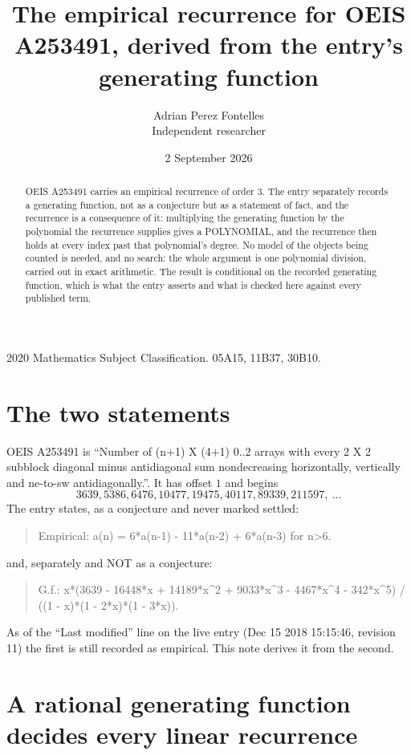 \documentclass[11pt,a4paper]{article}
\title{The empirical recurrence for OEIS A253491, derived from the entry's generating function}
\author{Adrian Perez Fontelles\\ \small Independent researcher}
\date{2 September 2026}
\theoremstyle{plain}
\theoremstyle{definition}
\begin{document}
\maketitle

\begin{abstract}
OEIS A253491 carries an empirical recurrence of order $3$. The entry separately records a
generating function, not as a conjecture but as a statement of fact, and the recurrence is a
consequence of it: multiplying the generating function by the polynomial the recurrence
supplies gives a POLYNOMIAL, and the recurrence then holds at every index past that
polynomial's degree. No model of the objects being counted is needed, and no search: the
whole argument is one polynomial division, carried out in exact arithmetic. The result is
conditional on the recorded generating function, which is what the entry asserts and what is
checked here against every published term.
\end{abstract}

\noindent\small 2020 Mathematics Subject Classification. 05A15, 11B37, 30B10.\normalsize

\section{The two statements}

OEIS A253491 is ``Number of (n+1) X (4+1) 0..2 arrays with every 2 X 2 subblock diagonal minus antidiagonal sum nondecreasing horizontally, vertically and ne-to-sw antidiagonally.''. It has offset $1$ and begins
\[
3639, 5386, 6476, 10477, 19475, 40117, 89339, 211597,\ \dots
\]
The entry states, as a conjecture and never marked settled:
\begin{quote}
Empirical: a(n) = 6*a(n-1) - 11*a(n-2) + 6*a(n-3) for n>6.
\end{quote}
and, separately and NOT as a conjecture:
\begin{quote}
G.f.: x*(3639 - 16448*x + 14189*x\^{}2 + 9033*x\^{}3 - 4467*x\^{}4 - 342*x\^{}5) / ((1 - x)*(1 - 2*x)*(1 - 3*x)).
\end{quote}
As of the ``Last modified'' line on the live entry (Dec 15 2018 15:15:46, revision 11) the first is still
recorded as empirical. This note derives it from the second.

\section{A rational generating function decides every linear recurrence}
\end{document}
